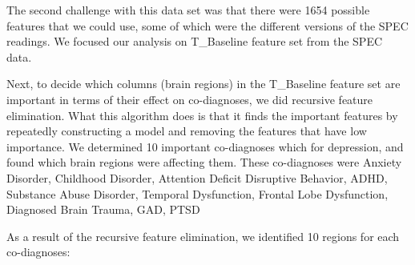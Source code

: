 \documentclass[9pt]{article}
\begin{document}
The second challenge with this data set was that there were 1654 possible features that we could use, some of which were the different versions of the SPEC readings. We focused our analysis on T\_Baseline feature set from the SPEC data.

Next, to decide which columns (brain regions) in the T\_Baseline feature set are important in terms of their effect on co-diagnoses, we did recursive feature elimination. What this algorithm does is that it finds the important features by repeatedly constructing a model and removing the features that have low importance. We determined 10 important co-diagnoses which for depression, and found which brain regions were affecting them. These co-diagnoses were Anxiety Disorder, Childhood Disorder, Attention Deficit Disruptive Behavior, ADHD, Substance Abuse Disorder, Temporal Dysfunction, Frontal Lobe Dysfunction, Diagnosed Brain Trauma, GAD, PTSD 

As a result of the recursive feature elimination, we identified 10 regions for each co-diagnoses:
\end{document}
